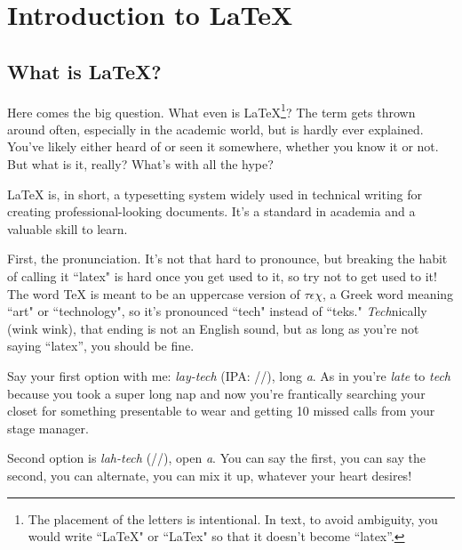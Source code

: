 \documentclass[letterpaper, 12pt]{article}
\begin{document}
\newpage

\fancyhead[L]{\nouppercase{\leftmark}}   %
\fancyhead[R]{\nouppercase{\rightmark}}  %
\fancyfoot[C]{\thepage}
\renewcommand{\sectionmark}[1]{
  \markboth{\thesection\ \textsc{#1}}{}}
\renewcommand{\subsectionmark}[1]{
  \markright{\thesubsection\ \textsc{#1}}}

\section{Introduction to \LaTeX}

\subsection{What is \LaTeX?}

Here comes the big question. What even is \LaTeX\footnote{The placement of the letters is intentional. In text, to avoid ambiguity, you would write ``LaTeX" or ``LaTex" so that it doesn't become ``latex''.}? The term gets thrown around often, especially in the academic world, but is hardly ever explained. You've likely either heard of or seen it somewhere, whether you know it or not. But what is it, really? What's with all the hype?

\LaTeX{} is, in short, a typesetting system widely used in technical writing for creating professional-looking documents. It's a standard in academia and a valuable skill to learn.

First, the pronunciation. It's not that hard to pronounce, but breaking the habit of calling it ``latex" is hard once you get used to it, so try not to get used to it! The word \TeX{} is meant to be an uppercase version of $\tau \epsilon \chi$, a Greek word meaning ``art" or ``technology", so it's pronounced ``tech" instead of ``teks." \textit{Tech}nically (wink wink), that ending is not an English sound, but as long as you're not saying ``latex'', you should be fine.

Say your first option with me: \textit{lay-tech} (IPA: //), long \emph{a}. As in you're \textit{late} to \textit{tech} because you took a super long nap and now you're frantically searching your closet for something presentable to wear and getting 10 missed calls from your stage manager.

Second option is \textit{lah-tech} (//), open \emph{a}. You can say the first, you can say the second, you can alternate, you can mix it up, whatever your heart desires!
\end{document}
